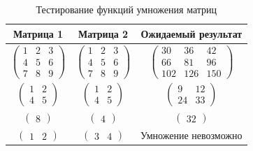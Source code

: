 \begin{table}[hb]
    \caption{\centering Тестирование функций умножения матриц}
    \centering
    \begin{tabular}{ccc}
    Матрица 1 & Матрица 2 & Ожидаемый результат \\ \hline
    $\begin{pmatrix}
        1 & 2 & 3 \\
        4 & 5 & 6 \\
        7 & 8 & 9
    \end{pmatrix}$
    &$\begin{pmatrix}
        1 & 2 & 3 \\
        4 & 5 & 6 \\
        7 & 8 & 9
    \end{pmatrix}$
    &$\begin{pmatrix}
        30 & 36 & 42 \\
        66 & 81 & 96 \\
        102 & 126 & 150
    \end{pmatrix}$\\
    $\begin{pmatrix}
        1 & 2 \\
        4 & 5
    \end{pmatrix}$
    &$\begin{pmatrix}
        1 & 2 \\
        4 & 5
    \end{pmatrix}$
    &$\begin{pmatrix}
        9 & 12 \\
        24 & 33
    \end{pmatrix}$\\
    $\begin{pmatrix}
        8
    \end{pmatrix}$
    &$\begin{pmatrix}
        4
    \end{pmatrix}$
    &$\begin{pmatrix}
        32
    \end{pmatrix}$\\
    $\begin{pmatrix} 1 & 2 \end{pmatrix}$ & $\begin{pmatrix} 3 & 4 \end{pmatrix}$ & Умножение невозможно
    \end{tabular}
    \label{tab:tests}
    \end{table}

